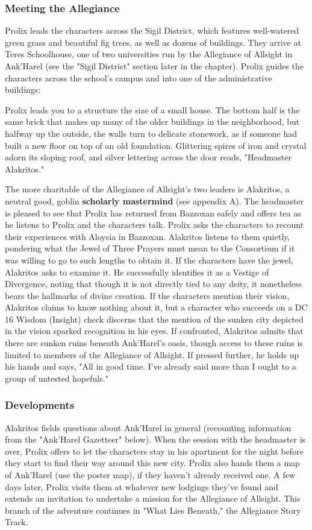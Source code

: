 \documentclass[10pt,a4,twoside,twocolumn,openany,nodeprecatedcode]{dndbook}
\begin{document}
\subsubsection{Meeting the Allegiance}
Prolix leads the characters across the Sigil District, which features well-watered green grass and beautiful fig trees, as well as dozens of buildings. They arrive at Teres Schoolhouse, one of two universities run by the Allegiance of Allsight in Ank'Harel (see the "Sigil District" section later in the chapter).
Prolix guides the characters across the school's campus and into one of the administrative buildings:
\begin{DndReadAloud}{}
Prolix leads you to a structure the size of a small house. The bottom half is the same brick that makes up many of the older buildings in the neighborhood, but halfway up the outside, the walls turn to delicate stonework, as if someone had built a new floor on top of an old foundation. Glittering spires of iron and crystal adorn its sloping roof, and silver lettering across the door reads, "Headmaster Alakritos."
\end{DndReadAloud}

The more charitable of the Allegiance of Allsight's two leaders is Alakritos, a neutral good, goblin \textbf{scholarly mastermind} (see appendix A). The headmaster is pleased to see that Prolix has returned from Bazzoxan safely and offers tea as he listens to Prolix and the characters talk.
Prolix asks the characters to recount their experiences with Aloysia in Bazzoxan. Alakritos listens to them quietly, pondering what the Jewel of Three Prayers must mean to the Consortium if it was willing to go to such lengths to obtain it.
If the characters have the jewel, Alakritos asks to examine it. He successfully identifies it as a Vestige of Divergence, noting that though it is not directly tied to any deity, it nonetheless bears the hallmarks of divine creation. If the characters mention their vision, Alakritos claims to know nothing about it, but a character who succeeds on a DC 16 Wisdom (Insight) check discerns that the mention of the sunken city depicted in the vision sparked recognition in his eyes. If confronted, Alakritos admits that there are sunken ruins beneath Ank'Harel's oasis, though access to these ruins is limited to members of the Allegiance of Allsight. If pressed further, he holds up his hands and says, "All in good time. I've already said more than I ought to a group of untested hopefuls."
\subsubsection{Developments}
Alakritos fields questions about Ank'Harel in general (recounting information from the "Ank'Harel Gazetteer" below). When the session with the headmaster is over, Prolix offers to let the characters stay in his apartment for the night before they start to find their way around this new city. Prolix also hands them a map of Ank'Harel (use the poster map), if they haven't already received one.
A few days later, Prolix visits them at whatever new lodgings they've found and extends an invitation to undertake a mission for the Allegiance of Allsight. This branch of the adventure continues in "What Lies Beneath," the Allegiance Story Track.
\end{document}
